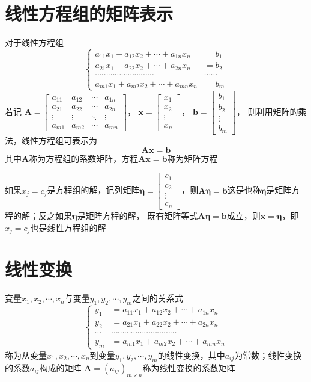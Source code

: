 \documentclass[UTF8]{ctexart}
\newcommand{\ve}[1]{{\bm{#1}}}
\newcommand{\mat}[1]{\ve{#1}}
\begin{document}
\section*{线性方程组的矩阵表示}
对于线性方程组
\[\left\{
\begin{aligned}
a_{11}x_1+a_{12}x_2+\cdots+a_{1n}x_n&=b_1\\
a_{21}x_1+a_{22}x_2+\cdots+a_{2n}x_n&=b_2\\
\cdots\cdots\cdots\cdots\cdots\cdots\cdots\cdots\cdots&\cdots\cdots\\
a_{m1}x_1+a_{m2}x_2+\cdots+a_{mn}x_n&=b_m
\end{aligned}
\right.\]
若记
$\displaystyle\mat{A}=\begin{bmatrix}
a_{11}&a_{12}&\cdots&a_{1n}\\
a_{21}&a_{22}&\cdots&a_{2n}\\
\vdots&\vdots&\ddots&\vdots\\
a_{m1}&a_{m2}&\cdots&a_{mn}
\end{bmatrix}$，
$\displaystyle\mat{x}=\begin{bmatrix}
x_1\\
x_2\\
\vdots\\
x_n
\end{bmatrix}$，
$\displaystyle\mat{b}=\begin{bmatrix}
b_1\\
b_2\\
\vdots\\
b_m
\end{bmatrix}$，
则利用矩阵的乘法，线性方程组可表示为
\[\mat{A}\mat{x}=\mat{b}\]
其中$\mat{A}$称为方程组的系数矩阵，方程$\mat{A}\mat{x}=\mat{b}$称为矩阵方程

如果$x_j=c_j$是方程组的解，记列矩阵$\mat{\eta}=\begin{bmatrix}
c_1\\
c_2\\
\vdots\\
c_n
\end{bmatrix}$，则$\mat{A}\mat{\eta}=\mat{b}$这是也称$\mat{\eta}$是矩阵方程的解；反之如果$\mat{\eta}$是矩阵方程的解，
既有矩阵等式$\mat{A}\mat{\eta}=\mat{b}$成立，则$\mat{x}=\mat{\eta}$，即$x_j=c_j$也是线性方程组的解

\section*{线性变换}
变量$x_1,x_2,\cdots,x_n$与变量$y_1,y_2,\cdots,y_m$之间的关系式
\[\left\{
\begin{aligned}
y_1&=a_{11}x_1+a_{12}x_2+\cdots+a_{1n}x_n\\
y_2&=a_{21}x_1+a_{22}x_2+\cdots+a_{2n}x_n\\
\cdots&\cdots\cdots\cdots\cdots\cdots\cdots\cdots\cdots\cdots\cdots\\
y_m&=a_{m1}x_1+a_{m2}x_2+\cdots+a_{mn}x_n
\end{aligned}
\right.\]
称为从变量$x_1,x_2,\cdots,x_n$到变量$y_1,y_2,\cdots,y_m$的线性变换，其中$a_{ij}$为常数；线性变换的系数$a_{ij}$构成的矩阵
$\mat{A}=(a_{ij})_{m\times n}$称为线性变换的系数矩阵
\end{document}
